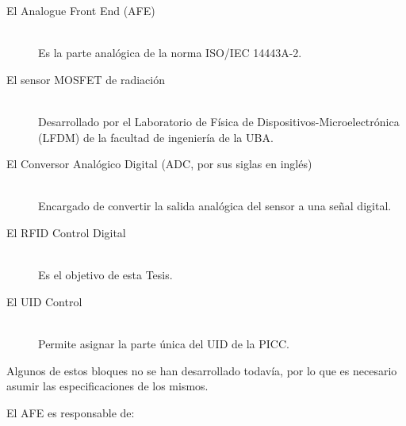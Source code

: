 \documentclass[a4paper, twoside, 11pt]{report}
\begin{document}
\begin{description}
  \item[El Analogue Front End (AFE)] \hfill \\ Es la parte analógica de la norma ISO/IEC 14443A-2.
  \item[El sensor MOSFET de radiación] \hfill \\ Desarrollado por el Laboratorio de Física de Dispositivos-Microelectrónica (LFDM) de la facultad de ingeniería de la UBA.
  \item[El Conversor Analógico Digital (ADC, por sus siglas en inglés)] \hfill \\ Encargado de convertir la salida analógica del sensor a una señal digital.
  \item[El RFID Control Digital] \hfill \\ Es el objetivo de esta Tesis.
  \item[El UID Control] \hfill \\ Permite asignar la parte única del UID de la PICC.
\end{description}

Algunos de estos bloques no se han desarrollado todavía, por lo que es necesario asumir las especificaciones de los mismos.

El AFE es responsable de:
\end{document}
